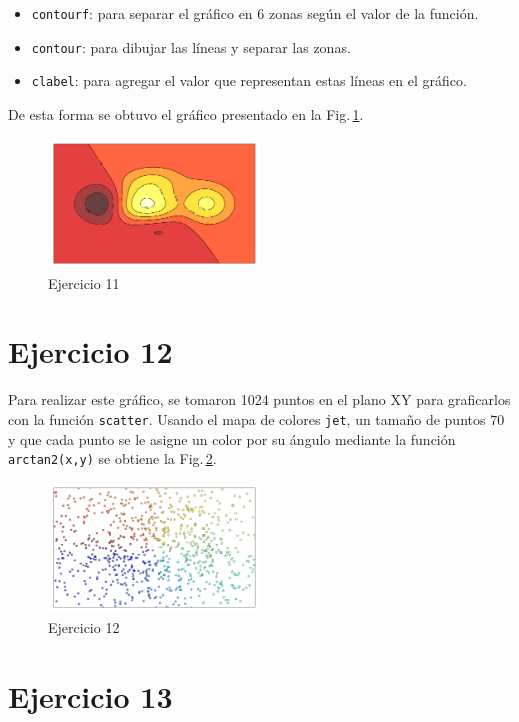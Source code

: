 \begin{itemize}
	\item \verb|contourf|: para separar el gráfico en 6 zonas según el valor de la función.
	\item \verb|contour|: para dibujar las líneas y separar las zonas.
	\item \verb|clabel|: para agregar el valor que representan estas líneas en el gráfico.

\end{itemize}
De esta forma se obtuvo el gráfico presentado en la Fig.\,\ref{fig:ejer11}.

\begin{figure}[H]
	\centering
	\includegraphics[width=0.5\textwidth]{ejer_11.pdf}
	\caption{Ejercicio 11}
	\label{fig:ejer11}
\end{figure}
	

\section*{Ejercicio 12}

Para realizar este gráfico, se tomaron 1024 puntos en el plano XY para graficarlos con la función \verb|scatter|. Usando el mapa de colores \verb|jet|, un tamaño de puntos $70$ y que cada punto se le asigne un color por su ángulo mediante la función \verb|arctan2(x,y)| se obtiene la Fig.\,\ref{fig:ejer12}.

\begin{figure}[H]
	\centering
	\includegraphics[width=0.5\textwidth]{ejer_12.pdf}
	\caption{Ejercicio 12}
	\label{fig:ejer12}
\end{figure}
	

\section*{Ejercicio 13}

